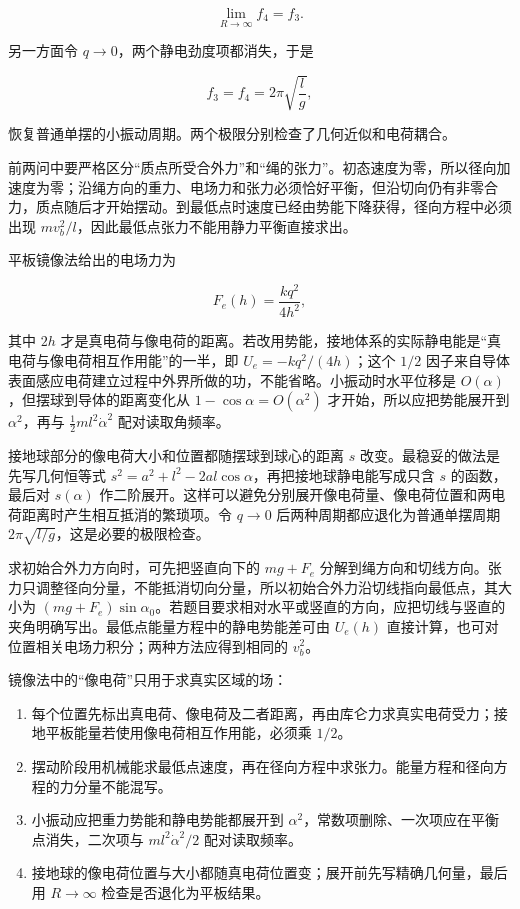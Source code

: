\documentclass[12pt,a4paper,UTF8]{ctexart}
\newcommand{\tightlist}{\setlength{\itemsep}{0pt}\setlength{\parskip}{0pt}}
\begin{document}
\[\lim_{R\to\infty}f_4=f_3.\]

另一方面令 \(q\to0\)，两个静电劲度项都消失，于是

\[f_3=f_4=2\pi\sqrt{\frac{l}{g}},\]

恢复普通单摆的小振动周期。两个极限分别检查了几何近似和电荷耦合。

前两问中要严格区分``质点所受合外力''和``绳的张力''。初态速度为零，所以径向加速度为零；沿绳方向的重力、电场力和张力必须恰好平衡，但沿切向仍有非零合力，质点随后才开始摆动。到最低点时速度已经由势能下降获得，径向方程中必须出现
\(mv_b^2/l\)，因此最低点张力不能用静力平衡直接求出。

平板镜像法给出的电场力为

\[F_e(h)=\frac{kq^2}{4h^2},\]

其中 \(2h\)
才是真电荷与像电荷的距离。若改用势能，接地体系的实际静电能是``真电荷与像电荷相互作用能''的一半，即
\(U_e=-kq^2/(4h)\)；这个 \(1/2\)
因子来自导体表面感应电荷建立过程中外界所做的功，不能省略。小振动时水平位移是
\(O(\alpha)\)，但摆球到导体的距离变化从 \(1-\cos\alpha=O(\alpha^2)\)
才开始，所以应把势能展开到 \(\alpha^2\)，再与
\(\tfrac12ml^2\dot\alpha^2\) 配对读取角频率。

接地球部分的像电荷大小和位置都随摆球到球心的距离 \(s\)
改变。最稳妥的做法是先写几何恒等式
\(s^2=a^2+l^2-2al\cos\alpha\)，再把接地球静电能写成只含 \(s\)
的函数，最后对 \(s(\alpha)\)
作二阶展开。这样可以避免分别展开像电荷量、像电荷位置和两电荷距离时产生相互抵消的繁琐项。令
\(q\to0\) 后两种周期都应退化为普通单摆周期
\(2\pi\sqrt{l/g}\)，这是必要的极限检查。

求初始合外力方向时，可先把竖直向下的 \(mg+F_e\)
分解到绳方向和切线方向。张力只调整径向分量，不能抵消切向分量，所以初始合外力沿切线指向最低点，其大小为
\((mg+F_e)\sin\alpha_0\)。若题目要求相对水平或竖直的方向，应把切线与竖直的夹角明确写出。最低点能量方程中的静电势能差可由
\(U_e(h)\) 直接计算，也可对位置相关电场力积分；两种方法应得到相同的
\(v_b^2\)。

镜像法中的``像电荷''只用于求真实区域的场：

\begin{enumerate}
\def\labelenumi{\arabic{enumi}.}
\tightlist
\item
  每个位置先标出真电荷、像电荷及二者距离，再由库仑力求真实电荷受力；接地平板能量若使用像电荷相互作用能，必须乘
  \(1/2\)。
\item
  摆动阶段用机械能求最低点速度，再在径向方程中求张力。能量方程和径向方程的力分量不能混写。
\item
  小振动应把重力势能和静电势能都展开到
  \(\alpha^2\)，常数项删除、一次项应在平衡点消失，二次项与
  \(ml^2\dot\alpha^2/2\) 配对读取频率。
\item
  接地球的像电荷位置与大小都随真电荷位置变；展开前先写精确几何量，最后用
  \(R\to\infty\) 检查是否退化为平板结果。
\end{enumerate}
\end{document}
